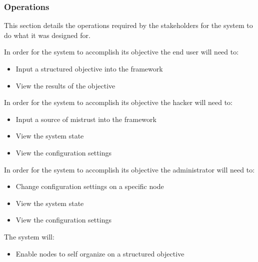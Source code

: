 \documentclass[draftclsnofoot, onecolumn, compsoc, 10pt]{IEEEtran}
\begin{document}
 
\subsubsection{Operations}%
This section details the operations required by the stakeholders for the system to do what it was designed for.

In order for the system to accomplish its objective the end user will need to:
\begin{itemize}
\item Input a structured objective into the framework 
\item View the results of the objective 
\end{itemize}

In order for the system to accomplish its objective the hacker will need to:
\begin{itemize}
\item Input a source of mistrust into the framework 
\item View the system state 
\item View the configuration settings 
\end{itemize}

In order for the system to accomplish its objective the administrator will need to:
\begin{itemize}
\item Change configuration settings on a specific node 
\item View the system state 
\item View the configuration settings 
\end{itemize}

The system will:
\begin{itemize}
\item Enable nodes to self organize on a structured objective 
\end{itemize}
\end{document}
